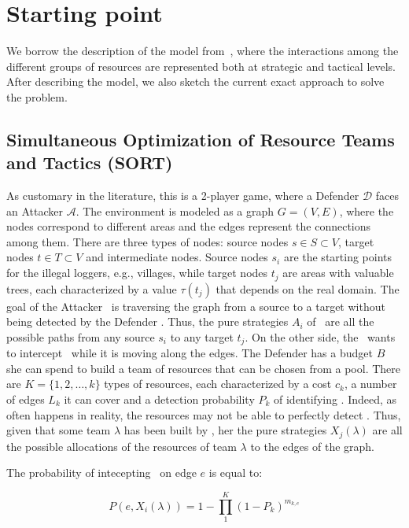\section{Starting point}\label{sec:problem_formulation}
We borrow the description of the model from~\cite{mc2016preventing}, where the interactions among the different groups of resources are represented both at strategic and tactical levels. After describing the model, we also sketch the current exact approach to solve the problem.

\subsection{Simultaneous Optimization of Resource Teams and Tactics (SORT)}
As customary in the literature, this is a 2-player game, where a Defender $\mathcal{D}$ faces an Attacker $\mathcal{A}$. The environment is modeled as a graph $G=(V,E)$, where the nodes correspond to different areas and the edges represent the connections among them. There are three types of nodes: source nodes $s \in S \subset V$, target nodes $t \in T \subset V$ and intermediate nodes. Source nodes $s_i$ are the starting points for the illegal loggers, e.g., villages, while target nodes $t_j$ are areas with valuable trees, each characterized by a value $\tau(t_j)$ that depends on the real domain. The goal of the Attacker \Att~is traversing the graph from a source to a target without being detected by the Defender \Def. Thus, the pure strategies $A_i$ of \Att~are all the possible paths from any source $s_i$ to any target $t_j$. On the other side, the \Def~wants to intercept \Att~while it is moving along the edges. The Defender has a budget $B$ she can spend to build a team of resources that can be chosen from a pool. There are $K = \{1,2,\ldots,k\}$ types of resources, each characterized by a cost $c_k$, a number of edges $L_k$ it can cover and a detection probability $P_k$ of identifying \Att. Indeed, as often happens in reality, the resources may not be able to perfectly detect \Att. Thus, given that some team $\lambda$ has been built by \Def, her the pure strategies $X_j(\lambda)$ are all the possible allocations of the resources of team $\lambda$ to the edges of the graph.

The probability of intecepting \Att~on edge $e$ is equal to:

\begin{equation*}
P(e,X_i(\lambda)) = 1 - \prod_1^{K}(1-P_k)^{m_{k,e}}
\end{equation*}

